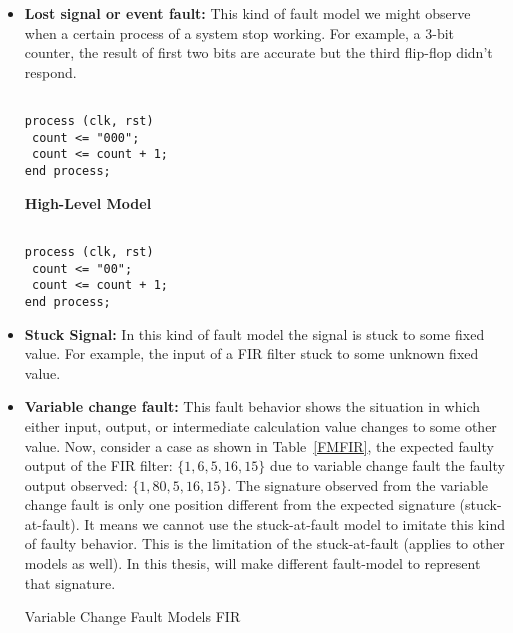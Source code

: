 

\begin{itemize}

\item \textbf{Lost signal or event fault:} This kind of fault model we might observe when a certain process of a system stop working. For example, a 3-bit counter, the result of first two bits are accurate but the third flip-flop didn't respond.


\begin{lstlisting}[frame=single]  % Start your code-block

process (clk, rst)
 count <= "000";
 count <= count + 1;
end process;
\end{lstlisting}

\textbf{High-Level Model}

\begin{lstlisting}[frame=single]  % Start your code-block

process (clk, rst)
 count <= "00";
 count <= count + 1;
end process;
\end{lstlisting}



\item \textbf{Stuck Signal:} In this kind of fault model the signal is stuck to some fixed value. For example, the input of a FIR filter stuck to some unknown fixed value. 

 

\item \textbf{Variable change fault:} This fault behavior shows the situation in which either input, output, or intermediate calculation value changes to some other value. Now, consider a case as shown in Table~\ref{FMFIR}, the expected faulty output of the FIR filter: $\{1, 6, 5, 16, 15\}$ due to variable change fault the faulty output observed: $\{1, 80, 5, 16, 15\}$. The signature observed from the variable change fault is only one position different from the expected signature (stuck-at-fault).  It means we cannot use the stuck-at-fault model to imitate this kind of faulty behavior. This is  the limitation of the stuck-at-fault (applies to other models as well). In this thesis, will make different fault-model to represent that signature.


\begin{table}[tb!]
\center
\caption{Variable Change Fault Models FIR}


\end{table}
\end{itemize}
